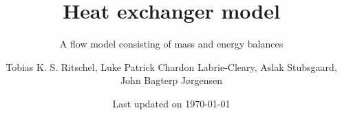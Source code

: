\title{Heat exchanger model}
\subtitle{A flow model consisting of mass and energy balances}

\author{Tobias K. S. Ritschel, Luke Patrick Chardon Labrie-Cleary, Aslak Stubsgaard, John Bagterp Jørgensen}
\date{Last updated on \today}